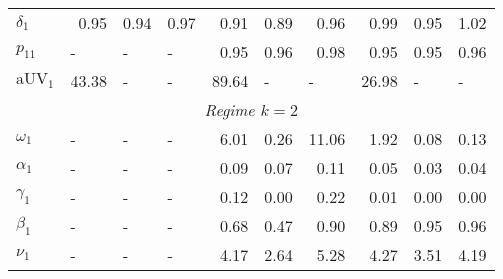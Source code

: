 \documentclass[12pt,a4paper]{article}
\begin{document}
\begin{table}[htbp]
\begin{threeparttable}
\begin{tabular}{llllrrrrrr}
$\delta_1$     & \multicolumn{1}{r}{0.95}          & \multicolumn{1}{r}{0.94}        & \multicolumn{1}{r}{0.97}        & 0.91                  & 0.89                  & 0.96                  & 0.99          & 0.95                  & 1.02                  \\
$p_11$         & -                                 & -                               & -                               & 0.95                  & 0.96                  & 0.98                  & 0.95          & 0.95                  & 0.96                  \\
$\text{aUV}_1$ & \multicolumn{1}{r}{43.38}         & -                               & -                               & 89.64                 & \multicolumn{1}{l}{-} & \multicolumn{1}{l}{-} & 26.98         & \multicolumn{1}{l}{-} & \multicolumn{1}{l}{-} \\
\multicolumn{10}{c}{\textit{Regime $k=2$}}                                                                                                                                                                                                                     \\
$\omega_1$     & -                                 & -                               & -                               & 6.01                  & 0.26                  & 11.06                 & 1.92          & 0.08                  & 0.13                  \\
$\alpha_1$     & -                                 & -                               & -                               & 0.09                  & 0.07                  & 0.11                  & 0.05          & 0.03                  & 0.04                  \\
$\gamma_1$     & -                                 & -                               & -                               & 0.12                  & 0.00                  & 0.22                  & 0.01          & 0.00                  & 0.00                  \\
$\beta_1$      & -                                 & -                               & -                               & 0.68                  & 0.47                  & 0.90                  & 0.89          & 0.95                  & 0.96                  \\
$\nu_1$        & -                                 & -                               & -                               & 4.17                  & 2.64                  & 5.28                  & 4.27          & 3.51                  & 4.19                  \\

\end{tabular}
\end{threeparttable}
\end{table}
\end{document}
